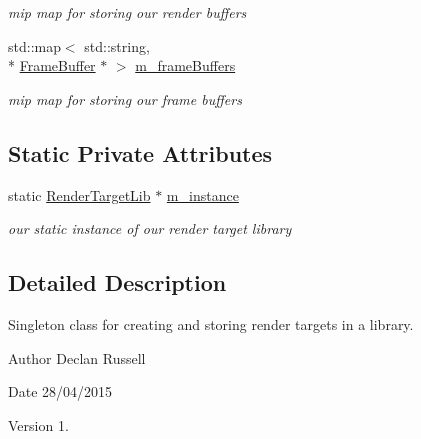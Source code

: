 \begin{DoxyCompactItemize}
\begin{DoxyCompactList}\small\item\em mip map for storing our render buffers \end{DoxyCompactList}\item 
\hypertarget{class_render_target_lib_af046f7ba4ccb1a5750594ae3f3d4ce3a}{std\-::map$<$ std\-::string, \\*
\hyperlink{class_frame_buffer}{Frame\-Buffer} $\ast$ $>$ \hyperlink{class_render_target_lib_af046f7ba4ccb1a5750594ae3f3d4ce3a}{m\-\_\-frame\-Buffers}}\label{class_render_target_lib_af046f7ba4ccb1a5750594ae3f3d4ce3a}

\begin{DoxyCompactList}\small\item\em mip map for storing our frame buffers \end{DoxyCompactList}\end{DoxyCompactItemize}
\subsection*{Static Private Attributes}
\begin{DoxyCompactItemize}
\item 
\hypertarget{class_render_target_lib_a010764661d409ec73902e644e9825a1f}{static \hyperlink{class_render_target_lib}{Render\-Target\-Lib} $\ast$ \hyperlink{class_render_target_lib_a010764661d409ec73902e644e9825a1f}{m\-\_\-instance}}\label{class_render_target_lib_a010764661d409ec73902e644e9825a1f}

\begin{DoxyCompactList}\small\item\em our static instance of our render target library \end{DoxyCompactList}\end{DoxyCompactItemize}


\subsection{Detailed Description}
Singleton class for creating and storing render targets in a library. 

\begin{DoxyAuthor}{Author}
Declan Russell 
\end{DoxyAuthor}
\begin{DoxyDate}{Date}
28/04/2015 
\end{DoxyDate}
\begin{DoxyVersion}{Version}
1. 
\end{DoxyVersion}


